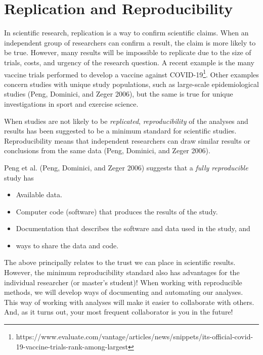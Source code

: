 \documentclass[
  11pt,
  letterpaper,
]{scrbook}
\providecommand{\tightlist}{%
  \setlength{\itemsep}{0pt}\setlength{\parskip}{0pt}}\usepackage{longtable,booktabs,array}
\begin{document}
\hypertarget{replication-and-reproducibility}{%
\section{Replication and
Reproducibility}\label{replication-and-reproducibility}}

In scientific research, replication is a way to confirm scientific
claims. When an independent group of researchers can confirm a result,
the claim is more likely to be true. However, many results will be
impossible to replicate due to the size of trials, costs, and urgency of
the research question. A recent example is the many vaccine trials
performed to develop a vaccine against COVID-19\footnote{https://www.evaluate.com/vantage/articles/news/snippets/its-official-covid-19-vaccine-trials-rank-among-largest}.
Other examples concern studies with unique study populations, such as
large-scale epidemiological studies (Peng, Dominici, and Zeger 2006),
but the same is true for unique investigations in sport and exercise
science.

When studies are not likely to be \emph{replicated},
\emph{reproducibility} of the analyses and results has been suggested to
be a minimum standard for scientific studies. Reproducibility means that
independent researchers can draw similar results or conclusions from the
same data (Peng, Dominici, and Zeger 2006).

Peng et al. (Peng, Dominici, and Zeger 2006) suggests that a \emph{fully
reproducible} study has

\begin{itemize}
\tightlist
\item
  Available data.
\item
  Computer code (software) that produces the results of the study.
\item
  Documentation that describes the software and data used in the study,
  and
\item
  ways to share the data and code.
\end{itemize}

The above principally relates to the trust we can place in scientific
results. However, the minimum reproducibility standard also has
advantages for the individual researcher (or master's student)! When
working with reproducible methods, we will develop ways of documenting
and automating our analyses. This way of working with analyses will make
it easier to collaborate with others. And, as it turns out, your most
frequent collaborator is you in the future!
\end{document}
